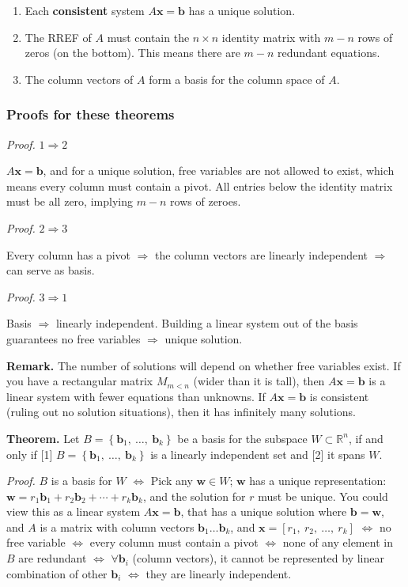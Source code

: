 \documentclass[
]{article}
\begin{document}
\begin{enumerate}
\def\labelenumi{\arabic{enumi}.}
\item
  Each \textbf{consistent} system $A\mathbf{x} = \mathbf{b}$
  has a unique solution.
\item
  The RREF of $A$ must contain the $n \times n$ identity matrix with
  $m - n$ rows of zeros (on the bottom). This means there are
  $m - n$ redundant equations.
\item
  The column vectors of $A$ form a basis for the column space of
  $A$.
\end{enumerate}


\subsubsection{Proofs for these
theorems}

\emph{Proof.} $1 \Rightarrow 2$

$A\mathbf{x} = \mathbf{b}$, and for a unique solution, free
variables are not allowed to exist, which means every column must
contain a pivot. All entries below the identity matrix must be all zero,
implying $m - n$ rows of zeroes.

\emph{Proof.} $2 \Rightarrow 3$

Every column has a pivot $\Rightarrow$ the column vectors are linearly
independent $\Rightarrow$ can serve as basis.

\emph{Proof.} $3 \Rightarrow 1$

Basis $\Rightarrow$ linearly independent. Building a linear system out
of the basis guarantees no free variables $\Rightarrow$ unique
solution.

\textbf{Remark.} The number of solutions will depend on whether free
variables exist. If you have a rectangular matrix $M_{m < n}$ (wider
than it is tall), then $A\mathbf{x} = \mathbf{b}$ is a linear
system with fewer equations than unknowns. If
$A\mathbf{x} = \mathbf{b}$ is consistent (ruling out no
solution situations), then it has infinitely many solutions.

\textbf{Theorem.} Let
$B = \left\{ {\mathbf{b}}_{1},\ \ldots,\ {\mathbf{b}}_{k} \right\}$
be a basis for the subspace $W \subset \mathbb{R}^{n}$, if and only if
{[}1{]}
$B = \left\{ {\mathbf{b}}_{1},\ \ldots,\ {\mathbf{b}}_{k} \right\}$
is a linearly independent set and {[}2{]} it spans $W$.

\emph{Proof.} $B$ is a basis for $W$ $\Leftrightarrow$ Pick any
$\mathbf{w} \in W$; $\mathbf{w}$ has a unique
representation:
$\mathbf{w} = r_{1}{\mathbf{b}}_{1} + r_{2}{\mathbf{b}}_{2} + \cdots + r_{k}{\mathbf{b}}_{k}$,
and the solution for $r$ must be unique. You could view this as a
linear system $A\mathbf{x} = \mathbf{b}$, that has a unique
solution where $\mathbf{b} = \mathbf{w}$, and $A$ is a
matrix with column vectors
${\mathbf{b}}_{1}\ldots{\mathbf{b}}_{k}$, and
$\mathbf{x} = \left\lbrack r_{1},\ r_{2},\ \ldots,\ r_{k} \right\rbrack$
$\Leftrightarrow$ no free variable $\Leftrightarrow$ every column
must contain a pivot $\Leftrightarrow$ none of any element in $B$
are redundant $\Leftrightarrow$ $\forall{\mathbf{b}}_{i}$
(column vectors), it cannot be represented by linear combination of
other ${\mathbf{b}}_{i}$ $\Leftrightarrow$ they are linearly
independent.
\end{document}
